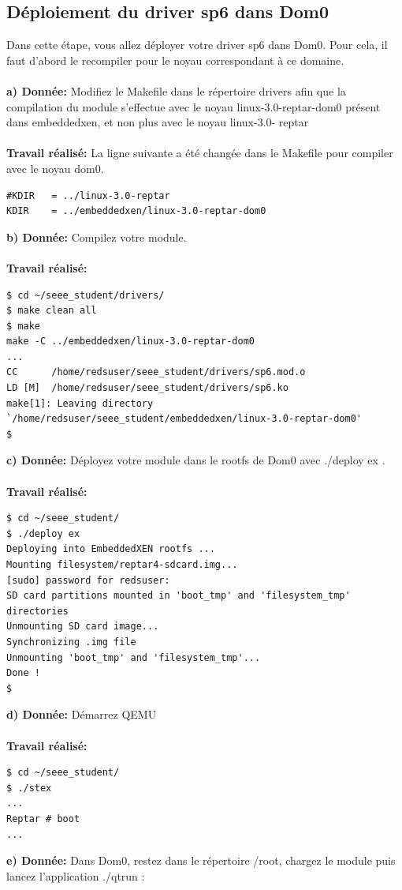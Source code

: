 \subsection{Déploiement du driver sp6 dans Dom0}
Dans cette étape, vous allez déployer votre driver sp6 dans Dom0. Pour cela, il faut d'abord le
recompiler pour le noyau correspondant à ce domaine.\\\\
\textbf{a) Donnée: }Modifiez le Makefile dans le répertoire drivers afin que la compilation du module s'effectue avec
le noyau linux-3.0-reptar-dom0 présent dans embeddedxen, et non plus avec le noyau linux-3.0-
reptar\\\\
\textbf{Travail réalisé: }La ligne suivante a été changée dans le Makefile pour compiler avec le noyau dom0.
\begin{lstlisting}
#KDIR	= ../linux-3.0-reptar
KDIR	= ../embeddedxen/linux-3.0-reptar-dom0
\end{lstlisting}
\textbf{b) Donnée: }Compilez votre module.\\\\
\textbf{Travail réalisé: }
\begin{lstlisting}
$ cd ~/seee_student/drivers/
$ make clean all
$ make
make -C ../embeddedxen/linux-3.0-reptar-dom0 
...
CC      /home/redsuser/seee_student/drivers/sp6.mod.o
LD [M]  /home/redsuser/seee_student/drivers/sp6.ko
make[1]: Leaving directory `/home/redsuser/seee_student/embeddedxen/linux-3.0-reptar-dom0'
$ 
\end{lstlisting}
\textbf{c) Donnée: }Déployez votre module dans le rootfs de Dom0 avec ./deploy ex .\\\\
\textbf{Travail réalisé: }
\begin{lstlisting}
$ cd ~/seee_student/
$ ./deploy ex
Deploying into EmbeddedXEN rootfs ...
Mounting filesystem/reptar4-sdcard.img...
[sudo] password for redsuser: 
SD card partitions mounted in 'boot_tmp' and 'filesystem_tmp' directories
Unmounting SD card image...
Synchronizing .img file
Unmounting 'boot_tmp' and 'filesystem_tmp'...
Done !
$
\end{lstlisting}
\textbf{d) Donnée: }Démarrez QEMU\\\\
\textbf{Travail réalisé: }
\begin{lstlisting}
$ cd ~/seee_student/
$ ./stex
...
Reptar # boot
...
\end{lstlisting}
\textbf{e) Donnée: }Dans Dom0, restez dans le répertoire /root, chargez le module puis lancez l'application ./qtrun :
